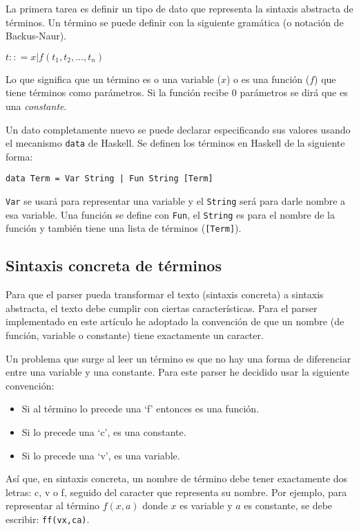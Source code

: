 \documentclass{article}
\begin{document}
La primera tarea es definir un tipo de dato que representa la sintaxis abstracta de términos. Un término se puede definir con la siguiente gramática (o notación de Backus-Naur).

$t :: = x | f (t_1,t_2,...,t_n)$

Lo que significa que un término es o una variable ($x$) o es una función ($f$) que tiene términos como parámetros. Si la función recibe 0 parámetros se dirá que es una \textit{constante}.

Un dato completamente nuevo se puede declarar especificando sus valores usando el mecanismo \texttt{data} de Haskell\cite{hutton}. Se definen los términos en Haskell de la siguiente forma:

\texttt{data Term = Var String | Fun String [Term]}

\texttt{Var} se usará para representar una variable y el \texttt{String} será para darle nombre a esa variable. Una función se define con \texttt{Fun}, el \texttt{String} es para el nombre de la función y también tiene una lista de términos (\texttt{[Term]}).

\subsection{Sintaxis concreta de términos}

Para que el parser pueda transformar el texto (sintaxis concreta) a sintaxis abstracta, el texto debe cumplir con ciertas características. Para el parser implementado en este artículo he adoptado la convención de que un nombre (de función, variable o constante) tiene exactamente un caracter.

Un problema que surge al leer un término es que no hay una forma de diferenciar entre una variable y una constante. Para este parser he decidido usar la siguiente convención:

\begin{itemize}
\item Si al término lo precede una `f' entonces es una función.
\item Si lo precede una `c', es una constante.
\item Si lo precede una `v', es una variable.
\end{itemize}

Así que, en sintaxis concreta, un nombre de término debe tener exactamente dos letras: c, v o f, seguido del caracter que representa su nombre. Por ejemplo, para representar al término $f(x, a)$ donde $x$ es variable y $a$ es constante, se debe escribir: \texttt{ff(vx,ca)}.
\end{document}

